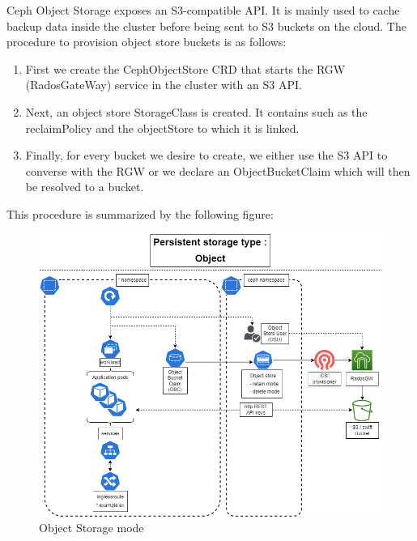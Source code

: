 \hspace{7mm}Ceph Object Storage exposes an S3-compatible API. It is mainly used to cache backup data inside the cluster before being sent to S3 buckets on the cloud. The procedure to provision object store buckets is as follows: 

\begin{enumerate}[label = (\arabic*)]
    \item First we create the CephObjectStore CRD that starts the RGW (RadosGateWay) service in the cluster with an S3 API. 
    \item Next, an object store StorageClass is created. It contains such as the reclaimPolicy and the objectStore to which it is linked. 
    \item Finally, for every bucket we desire to create, we either use the S3 API to converse with the RGW or we declare an ObjectBucketClaim which will then be resolved to a bucket. 
\end{enumerate}


\hspace{7mm}This procedure is summarized by the following figure: 

\begin{figure}[H]\centering
\includegraphics[width=1.0\textwidth,angle=00]{assets/f32.png}
\caption{Object Storage mode }
\label{fig:Object Storage mode}
\end{figure}

\newpage


